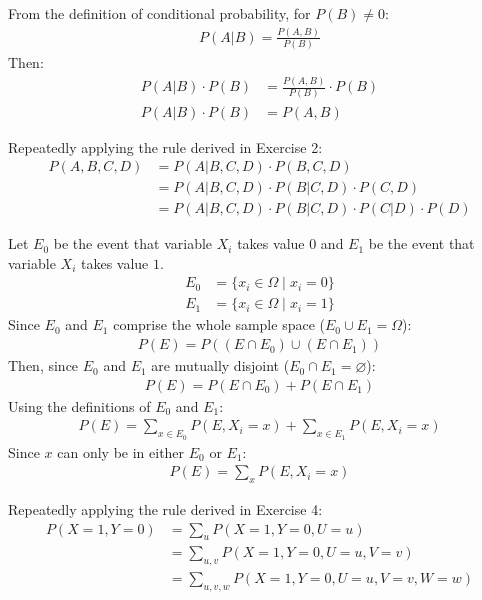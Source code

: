 \documentclass{article}
\begin{document}
\clearpage
\problem{}
From the definition of conditional probability, for $P(B) \neq 0$:
\begin{align*}
    P(A | B) = \frac{P(A, B)}{P(B)}
\end{align*}
Then:
\begin{align*}
    P(A | B) \cdot P(B) & = \frac{P(A, B)}{P(B)} \cdot P(B) \\
    P(A | B) \cdot P(B) & = P(A, B)
\end{align*}

\clearpage
\problem{}
Repeatedly applying the rule derived in Exercise 2:
\begin{align*}
    P(A, B, C, D) & = P(A | B, C, D) \cdot P(B, C, D) \\
    & = P(A | B, C, D) \cdot P(B | C, D) \cdot P(C, D) \\
    & = P(A | B, C, D) \cdot P(B | C, D) \cdot P(C | D) \cdot P(D)
\end{align*}

\clearpage
\problem{}
Let $E_0$ be the event that variable $X_i$ takes value $0$ and $E_1$ be the event that variable $X_i$ takes value $1$.
\begin{align*}
    E_0 & = \{x_i \in \Omega \mid x_i = 0\} \\
    E_1 & = \{x_i \in \Omega \mid x_i = 1\}
\end{align*}
Since $E_0$ and $E_1$ comprise the whole sample space ($E_0 \cup E_1 = \Omega$):
\begin{align*}
    P(E) = P((E \cap E_0) \cup (E \cap E_1))
\end{align*}
Then, since $E_0$ and $E_1$ are mutually disjoint ($E_0 \cap E_1 = \varnothing$):
\begin{align*}
    P(E) = P(E \cap E_0) + P(E \cap E_1)
\end{align*}
Using the definitions of $E_0$ and $E_1$:
\begin{align*}
    P(E) = \sum_{x \in E_0} P(E, X_i = x) + \sum_{x \in E_1} P(E, X_i = x)
\end{align*}
Since $x$ can only be in either $E_0$ or $E_1$:
\begin{align*}
    P(E) = \sum_{x} P(E, X_i = x)
\end{align*}

\clearpage
\problem{}
Repeatedly applying the rule derived in Exercise 4:
\begin{align*}
    P(X = 1, Y = 0) & = \sum_{u} P(X = 1, Y = 0, U = u) \\
    & = \sum_{u, v} P(X = 1, Y = 0, U = u, V = v) \\
    & = \sum_{u, v, w} P(X = 1, Y = 0, U = u, V = v, W = w)
\end{align*}
\end{document}

